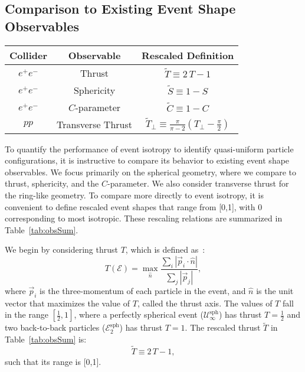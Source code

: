 \documentclass[letterpaper,11pt]{article}
\DeclareRobustCommand{\Tab}[1]{Table~\ref{#1}}
\begin{document}

\subsection{Comparison to Existing Event Shape Observables}
\label{subsec:compToEventShape}


\begin{table*}[!t]
\centering
\begin{tabular}{ c @{\quad} c @{\quad} c} 
\hline \hline
Collider & Observable & Rescaled Definition \\
\hline 
$e^+e^-$ & Thrust & $\widetilde{T} \equiv 2\,T-1$ \\
$e^+e^-$ &Sphericity & $\widetilde{S} \equiv 1 - S$ \\
$e^+e^-$ &$C$-parameter & $\widetilde{C} \equiv 1 - C$ \\
\hline
$pp$ & Transverse Thrust &  $\widetilde{T}_\perp \equiv \frac{\pi}{\pi-2}\left(T_\perp-\frac{\pi}{2}\right)$ \\
 \hline
 \hline
 \end{tabular}
\caption{
Previous event shape observables and their rescaled variants.
%
Like event isotropy $\mathcal{I}$, the rescaled event shapes range from [0,1], where $0$ is perfectly isotropic.
}
\label{tab:obsSum}
\end{table*}
 

To quantify the performance of event isotropy to identify quasi-uniform particle configurations, it is instructive to compare its behavior to existing event shape observables.
%
We focus primarily on the spherical geometry, where we compare to thrust, sphericity, and the $C$-parameter.
%
We also consider transverse thrust for the ring-like geometry.
%
To compare more directly to event isotropy, it is convenient to define rescaled event shapes that range from [0,1], with 0 corresponding to most isotropic.
%
These rescaling relations are summarized in \Tab{tab:obsSum}.


We begin by considering thrust $T$, which is defined as~\cite{Brandt:1964sa,Farhi:1977sg,DeRujula:1978vmq}: 
%
\begin{equation}
\label{eq:thrust_def}
T(\mathcal{E}) = \max_{\hat{n}} \frac{\sum_i | \vec{p}_i \cdot \hat{n}| }{\sum_j |\vec{p}_j|},
\end{equation} 
%
where $\vec{p}_i$ is the three-momentum of each particle in the event, and $\hat{n}$ is the unit vector that maximizes the value of $T$, called the thrust axis.
%
The values of $T$ fall in the range $[\frac{1}{2},1]$, where a perfectly spherical event ($\mathcal{U}^\text{sph}_{\infty}$) has thrust $T=\frac{1}{2}$ and two back-to-back particles ($\mathcal{E}^\text{sph}_2$) has thrust $T=1$. 
%
The rescaled thrust $\widetilde{T}$ in \Tab{tab:obsSum} is:
%
\begin{equation}
\widetilde{T} \equiv 2\, T-1,
\end{equation}
%
such that its range is [0,1].
\end{document}
